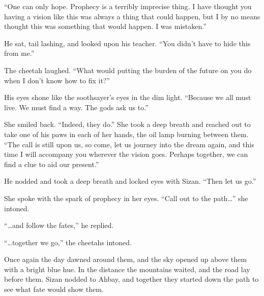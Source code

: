 ``One can only hope. Prophecy is a terribly imprecise thing. I have thought you having a vision like this was always a thing that could happen, but I by no means thought this was something that would happen. I was mistaken.''

He sat, tail lashing, and looked upon his teacher. ``You didn't have to hide this from me.''

The cheetah laughed. ``What would putting the burden of the future on you do when I don't know how to fix it?''

His eyes shone like the soothsayer's eyes in the dim light. ``Because we all must live. We must find a way. The gods ask us to.''

She smiled back. ``Indeed, they do.'' She took a deep breath and reached out to take one of his paws in each of her hands, the oil lamp burning between them. ``The call is still upon us, so come, let us journey into the dream again, and this time I will accompany you wherever the vision goes. Perhaps together, we can find a clue to aid our present.''

He nodded and took a deep breath and locked eyes with Sizan. ``Then let us go.''

She spoke with the spark of prophecy in her eyes. ``Call out to the path\ldots'' she intoned.

``\ldots{}and follow the fates,'' he replied.

``\ldots{}together we go,'' the cheetahs intoned.

Once again the day dawned around them, and the sky opened up above them with a bright blue hue. In the distance the mountains waited, and the road lay before them. Sizan nodded to Ahbay, and together they started down the path to see what fate would show them.
